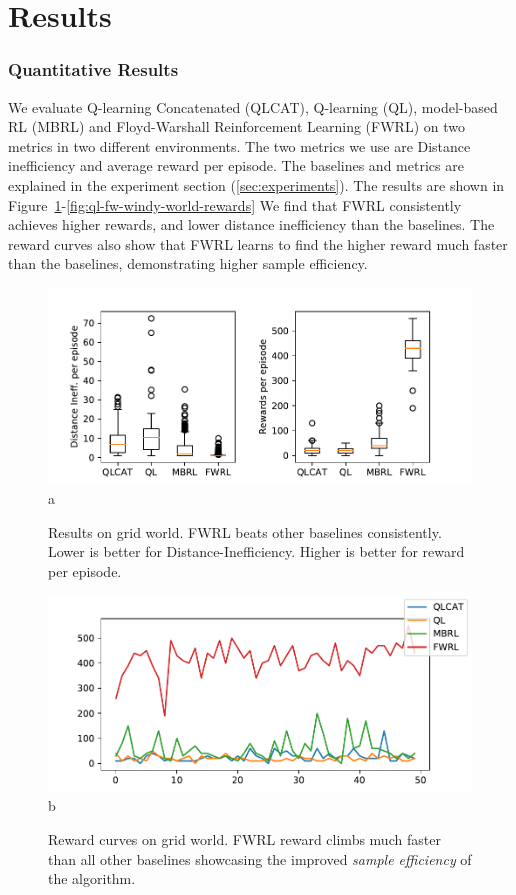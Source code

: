 \section{Results}
\subsubsection{Quantitative Results}
We evaluate Q-learning Concatenated (QLCAT), Q-learning (QL), model-based RL
(MBRL) and Floyd-Warshall Reinforcement Learning (FWRL) on two metrics in two
different environments. The two metrics we use are Distance inefficiency and
average reward per episode. The baselines and metrics are explained in the
experiment section (\ref{sec:experiments}). The results are shown in
Figure~\ref{fig:ql-fw-grid-world-results}-\ref{fig:ql-fw-windy-world-rewards} 
We find that FWRL consistently achieves higher rewards, and lower distance
inefficiency than the baselines. The reward curves also show that FWRL learns to
find the higher reward much faster than the baselines, demonstrating higher
sample efficiency.

\begin{figure}%
  \includegraphics[width=\columnwidth]{./media/metrics-grid-world.pdf}{a}
  \caption{Results on grid world. FWRL beats other baselines
    consistently. Lower is better for Distance-Inefficiency. Higher
    is better for reward per episode. }
  \label{fig:ql-fw-grid-world-results}%
\end{figure}

\begin{figure}
  \includegraphics[width=\columnwidth]{./media/rewards-metrics-grid-world.pdf}{b}
  \caption{Reward curves on grid world. FWRL reward climbs much
    faster than all other baselines showcasing the improved \emph{sample
      efficiency} of the algorithm.}
  \label{fig:ql-fw-grid-world-reward-curves}%
\end{figure}

